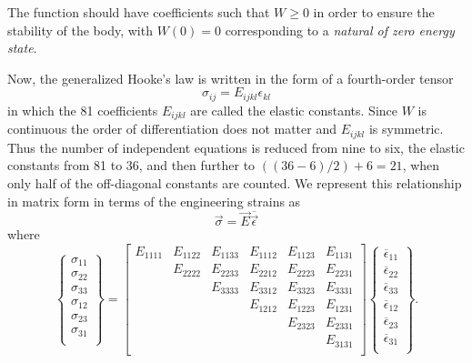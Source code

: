 The function should have coefficients such that $W \geq 0$ in order to ensure the stability of the body, with $W(0) = 0$ corresponding to a \textit{natural of zero energy state}.

Now, the generalized Hooke's law is written in the form of a fourth-order tensor
\begin{equation*}
  \sigma_{ij} = E_{ijkl} \epsilon_{kl}
\end{equation*}
in which the 81 coefficients $E_{ijkl}$ are called the elastic constants.
Since $W$ is continuous the order of differentiation does not matter and $E_{ijkl}$ is symmetric.
Thus the number of independent equations is reduced from nine to six, the elastic constants from 81 to 36, and then further to $\left( \left( 36 - 6 \right) / 2 \right) + 6 = 21$, when only half of the off-diagonal constants are counted.
We represent this relationship in matrix form in terms of the engineering strains as
\begin{equation*}
  \Vec{\sigma} = \Vec{E} \overline{\Vec{\epsilon}}
\end{equation*}
where
\begin{equation*}
  \left\{ \begin{array}{cccccc}
    \sigma_{11}\\
  \sigma_{22}\\
  \sigma_{33}\\
  \sigma_{12}\\
  \sigma_{23}\\
  \sigma_{31}\\
  \end{array} \right\} = \begin{bmatrix}
    E_{1111} & E_{1122} & E_{1133} & E_{1112} & E_{1123} & E_{1131}\\
   & E_{2222} & E_{2233} & E_{2212} & E_{2223} & E_{2231}\\
   &  & E_{3333} & E_{3312} & E_{3323} & E_{3331}\\
   &  &  & E_{1212} & E_{1223} & E_{1231}\\
   &  &  &  & E_{2323} & E_{2331}\\
   &  &  &  &  & E_{3131}\\
  \end{bmatrix} \left\{ \begin{array}{cccccc}
    \overline{\epsilon}_{11}\\
  \overline{\epsilon}_{22}\\
  \overline{\epsilon}_{33}\\
  \overline{\epsilon}_{12}\\
  \overline{\epsilon}_{23}\\
  \overline{\epsilon}_{31}\\
  \end{array} \right\}
.\end{equation*}
